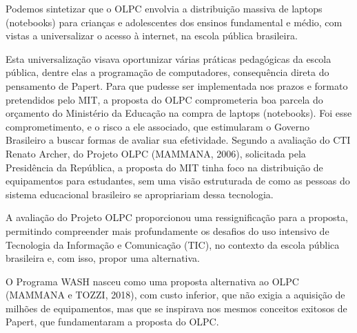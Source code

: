\documentclass[
12pt,		%
openright,	%
twoside,  %
a4paper,			%
chapter=TITLE,		%
english,			%
french,				%
spanish,			%
brazil				%
]{USPSC-classe/USPSC}
\begin{document}
Podemos sintetizar que o OLPC envolvia a distribui\c{c}\~ao massiva de laptops (notebooks) para crian\c{c}as e adolescentes dos ensinos fundamental e m\'edio, com vistas a universalizar o acesso \`a internet, na escola p\'ublica brasileira.

















Esta universaliza\c{c}\~ao visava oportunizar v\'arias pr\'aticas pedag\'ogicas da escola p\'ublica, dentre elas a programa\c{c}\~ao de computadores, consequ\^encia direta do pensamento de Papert. Para que pudesse ser implementada nos prazos e formato pretendidos pelo MIT, a proposta do OLPC comprometeria boa parcela do or\c{c}amento do Minist\'erio da Educa\c{c}\~ao na compra de laptops (notebooks). Foi esse comprometimento, e o risco a ele associado, que estimularam o Governo Brasileiro a buscar formas de avaliar sua efetividade. Segundo a avalia\c{c}\~ao do CTI Renato Archer, do Projeto OLPC  (MAMMANA, 2006), solicitada pela Presid\^encia da Rep\'ublica, a proposta do MIT tinha foco na distribui\c{c}\~ao de equipamentos para estudantes, sem uma vis\~ao estruturada de como as pessoas do sistema educacional brasileiro se apropriariam dessa tecnologia.

















A avalia\c{c}\~ao do Projeto OLPC proporcionou uma ressignifica\c{c}\~ao para a proposta, permitindo compreender mais profundamente os desafios do uso intensivo de Tecnologia da Informa\c{c}\~ao e Comunica\c{c}\~ao (TIC), no contexto da escola p\'ublica brasileira e, com isso, propor uma alternativa.

















O Programa WASH nasceu como uma proposta alternativa ao OLPC (MAMMANA e TOZZI, 2018), com custo inferior, que n\~ao exigia a aquisi\c{c}\~ao de milh\~oes de equipamentos, mas que se inspirava nos mesmos conceitos exitosos de Papert, que fundamentaram a proposta do OLPC.
\end{document}
